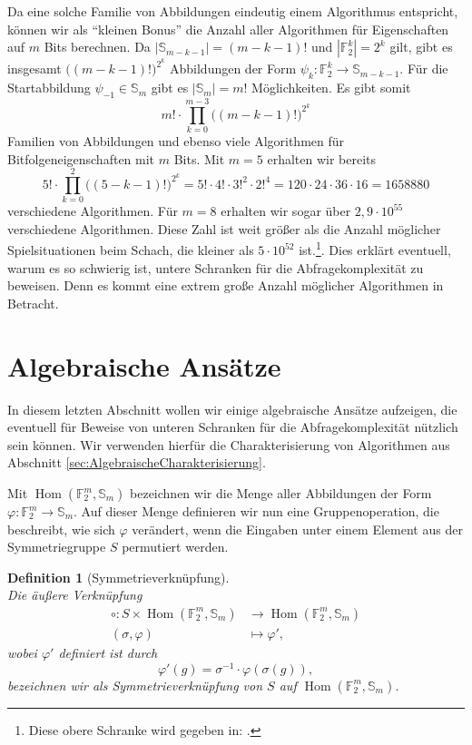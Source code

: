 \documentclass[10pt,a4paper, footheight=1mm]{scrreprt}
\newtheorem{definition}{Definition}
\theoremstyle{definition}
\DeclareMathOperator\Hom{Hom}
\begin{document}
Da eine solche Familie von Abbildungen eindeutig
einem Algorithmus entspricht, können wir als "`kleinen Bonus"'
die Anzahl aller Algorithmen für Eigenschaften auf $m$ Bits
berechnen. Da $|\mathbb{S}_{m-k-1}|=(m-k-1)!$ und
$|\mathbb{F}_2^k| = 2^k$ gilt, gibt es
insgesamt $\big((m-k-1)!\big)^{2^k}$ Abbildungen der Form
$\psi_k:\mathbb{F}_2^k \to \mathbb{S}_{m-k-1}$.
Für die Startabbildung $\psi_{-1}\in\mathbb{S}_m$ gibt
es $|\mathbb{S}_m| = m!$ Möglichkeiten.
Es gibt somit
$$m!\cdot \prod_{k=0}^{m-3} \big((m-k-1)!\big)^{2^k} $$
Familien von Abbildungen und ebenso viele Algorithmen
für Bitfolgeneigenschaften mit $m$ Bits.
Mit $m=5$ erhalten wir bereits 
$$5!\cdot \prod_{k=0}^2 \big((5-k-1)!\big)^{2^k}
= 5!\cdot 4! \cdot 3!^2 \cdot 2!^4
= 120 \cdot 24 \cdot 36 \cdot 16 = 1658880
$$
verschiedene Algorithmen. Für $m=8$ erhalten wir sogar
über $2,9 \cdot 10^{55}$ verschiedene Algorithmen. Diese
Zahl ist weit größer als die Anzahl möglicher 
Spielsituationen beim Schach, die kleiner als $5\cdot 10^{52}$
ist.\footnote{Diese obere Schranke wird gegeben in:
\cite{Allis}.}.
Dies erklärt eventuell, warum es so schwierig ist, untere
Schranken für die Abfragekomplexität zu beweisen. Denn
es kommt eine extrem große Anzahl möglicher Algorithmen
in Betracht.

\section{Algebraische Ansätze}
In diesem letzten Abschnitt wollen wir einige algebraische
Ansätze aufzeigen, die eventuell für Beweise von unteren
Schranken für die Abfragekomplexität nützlich sein können.
Wir verwenden hierfür die Charakterisierung von Algorithmen
aus Abschnitt \ref{sec:AlgebraischeCharakterisierung}.

Mit $\Hom(\mathbb{F}_2^m, \mathbb{S}_m)$ bezeichnen wir die
Menge aller Abbildungen der Form 
$\varphi: \mathbb{F}_2^m \to \mathbb{S}_m$.
Auf dieser Menge definieren wir nun eine Gruppenoperation,
die beschreibt, wie sich $\varphi$ verändert, wenn die
Eingaben unter einem Element aus der Symmetriegruppe $S$
permutiert werden.

\begin{definition}
[Symmetrieverknüpfung]
\ \\
Die äußere Verknüpfung
\begin{align*} 
\circ: S \times \Hom(\mathbb{F}_2^m, \mathbb{S}_m) &\to 
\Hom(\mathbb{F}_2^m, \mathbb{S}_m) \\
(\sigma, \varphi) &\mapsto \varphi',
\end{align*}
wobei $\varphi'$ definiert ist durch 
$$\varphi'(g)=\sigma^{-1} \cdot \varphi(\sigma(g)),$$
bezeichnen wir als \emph{Symmetrieverknüpfung} von
$S$ auf  $\Hom(\mathbb{F}_2^m, \mathbb{S}_m)$.
\end{definition}
\end{document}
